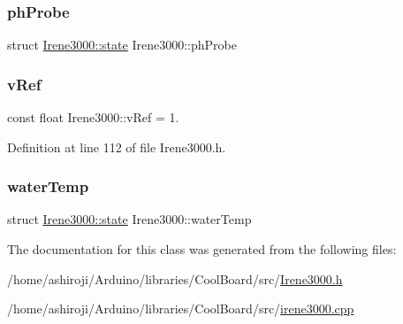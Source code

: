 \mbox{\label{class_irene3000_a997a4ee466fa1d5416e07e444965dc9e}} 
\subsubsection{\texorpdfstring{ph\+Probe}{phProbe}}
{\footnotesize\ttfamily struct \hyperlink{struct_irene3000_1_1state}{Irene3000\+::state}  Irene3000\+::ph\+Probe\hspace{0.3cm}{\ttfamily [private]}}

\mbox{\label{class_irene3000_a018e7ff9bee57e6d2b298667a668ba7e}} 
\subsubsection{\texorpdfstring{v\+Ref}{vRef}}
{\footnotesize\ttfamily const float Irene3000\+::v\+Ref = 1.\hspace{0.3cm}{\ttfamily [private]}}



Definition at line 112 of file Irene3000.\+h.

\mbox{\label{class_irene3000_af05612c78c758ce9db316c75ad937130}} 
\subsubsection{\texorpdfstring{water\+Temp}{waterTemp}}
{\footnotesize\ttfamily struct \hyperlink{struct_irene3000_1_1state}{Irene3000\+::state}  Irene3000\+::water\+Temp\hspace{0.3cm}{\ttfamily [private]}}



The documentation for this class was generated from the following files\+:\begin{DoxyCompactItemize}
\item 
/home/ashiroji/\+Arduino/libraries/\+Cool\+Board/src/\hyperlink{_irene3000_8h}{Irene3000.\+h}\item 
/home/ashiroji/\+Arduino/libraries/\+Cool\+Board/src/\hyperlink{irene3000_8cpp}{irene3000.\+cpp}\end{DoxyCompactItemize}
